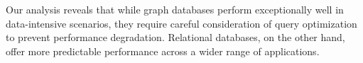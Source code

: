 Our analysis reveals that while graph databases perform exceptionally well in data-intensive scenarios, they require careful consideration of query optimization to prevent performance degradation. Relational databases, on the other hand, offer more predictable performance across a wider range of applications.
